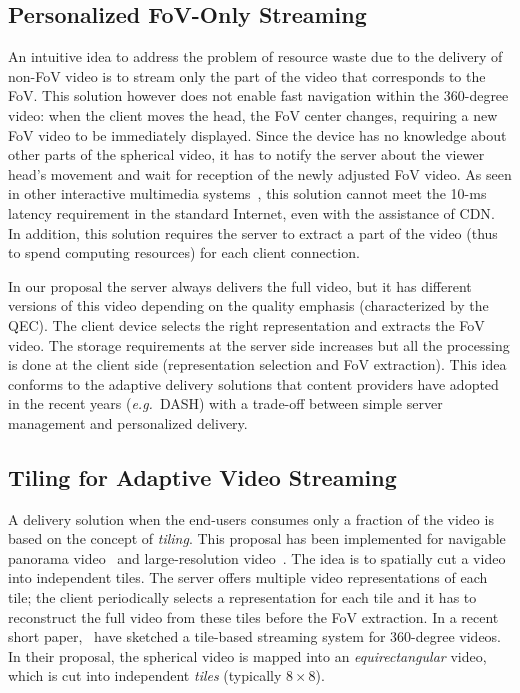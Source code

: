 \subsection{Personalized FoV-Only Streaming}

An intuitive idea to address the problem of resource waste due to the delivery of non-FoV video
is to stream only the part of the video that corresponds to the \ac{FoV}. This solution however
does not enable fast navigation within the 360-degree video: when the client moves the head, 
the FoV
center changes, requiring a new FoV video to be immediately displayed. Since
the device has no knowledge about other parts of the spherical video, it has to notify
the server about the viewer head's movement and wait for reception of the newly
adjusted FoV video. As seen in other interactive multimedia systems~\cite{ChoyWSR14},
this solution cannot meet the 10-ms latency requirement in the standard Internet, even 
with the assistance of \ac{CDN}. In addition, this solution requires the server to extract
a part of the video (thus to spend computing resources) for each 
client connection. 

 In our proposal the server always delivers the full video, but it
has different versions of this video depending on the quality emphasis (characterized by the QEC).
The client
device selects the right representation and extracts the \ac{FoV} video. The storage 
requirements at the
server side increases but all the processing is done at the client side (representation selection
and FoV extraction). 
This idea conforms to the adaptive delivery solutions 
that content providers have adopted in the recent years (\textit{e.g.}~\ac{DASH}) with
a trade-off between simple server management and personalized delivery.

\subsection{Tiling for Adaptive Video Streaming}

A delivery solution when the end-users consumes only a fraction of the video is based on the concept of \emph{tiling}.
This proposal has been implemented for navigable panorama
video~\cite{sanchez_compressed_2015,wang_mixing_2014,gaddam_tiling_2015} and 
large-resolution video~\cite{jean16mmsys}.
The idea is to spatially cut a video into independent tiles. The server offers 
multiple video representations of each tile; the client periodically selects a representation 
for each tile 
and it has to reconstruct
the full video from these tiles before the \ac{FoV} extraction. In a recent short 
paper,~\citet{ochi_live_2015} have sketched a tile-based streaming system for 360-degree 
videos.
In their proposal, the spherical video is mapped into an \emph{equirectangular} video, which
is cut into independent \emph{tiles} (typically $8\times 8$).

